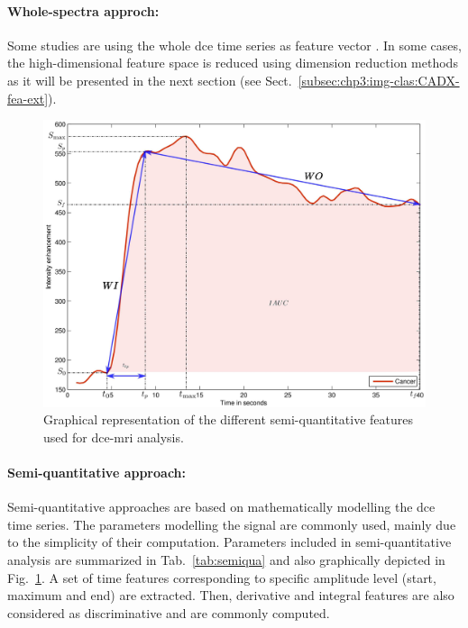 \paragraph{Whole-spectra approch:}
Some studies are using the whole \ac{dce} time series as feature vector \cite{Ampeliotis2007,Ampeliotis2008,Tiwari2012,Viswanath2008a,Viswanath2008}.
In some cases, the high-dimensional feature space is reduced using dimension reduction methods as it will be presented in the next section (see Sect.~\ref{subsec:chp3:img-clas:CADX-fea-ext}).

\begin{figure}
	\centering
	\includegraphics[width=.8\linewidth]{3_review/figures/feature-detection/dce/dce_cancer_parameters.eps}
	\caption[Semi-quantitative features used for \ac{dce}-\ac{mri}.]{Graphical representation of the different semi-quantitative features used for \ac{dce}-\ac{mri} analysis.}
	\label{fig:dceparam}
\end{figure}

\paragraph{Semi-quantitative approach:}
Semi-quantitative approaches are based on mathematically modelling the \ac{dce} time series.
The parameters modelling the signal are commonly used, mainly due to the simplicity of their computation.
Parameters included in semi-quantitative analysis are summarized in Tab.~\ref{tab:semiqua} and also graphically depicted in Fig.~\ref{fig:dceparam}.
A set of time features corresponding to specific amplitude level (start, maximum and end) are extracted.
Then, derivative and integral features are also considered as discriminative and are commonly computed.


